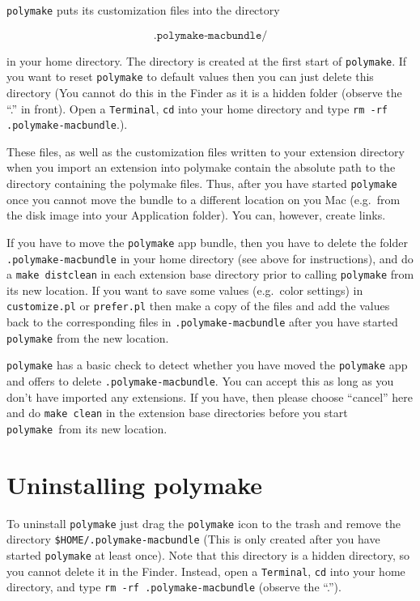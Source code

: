 \documentclass[a4paper]{amsart}
\newcommand{\polymake}{\texttt{polymake}\xspace}
\begin{document}
\polymake puts its customization files into the directory 

\[\texttt{.polymake-macbundle/} \]

in your home directory. The directory is created at the first start of
\polymake. If you want to reset \polymake to default values then you
can just delete this directory (You cannot do this in the Finder as it
is a hidden folder (observe the ``.'' in front). Open a \texttt{Terminal},
\texttt{cd} into your home directory and type \texttt{rm -rf
  .polymake-macbundle}.).

These files, as well as the customization files written to your
extension directory when you import an extension into polymake contain
the absolute path to the directory containing the polymake
files. Thus, after you have started \polymake once you cannot move
the bundle to a different location on you Mac (e.g.\ from the disk
image into your Application folder). You can, however, create links.

If you have to move the \polymake app bundle, then you have to delete
the folder \texttt{.polymake-macbundle} in your home directory (see
above for instructions), and do a \texttt{make distclean} in each
extension base directory prior to calling \polymake from its new
location. If you want to save some values (e.g.\ color settings) in
\texttt{customize.pl} or \texttt{prefer.pl} then make a copy of the
files and add the values back to the corresponding files in
\texttt{.polymake-macbundle} after you have started \polymake from
the new location.

\polymake has a basic check to detect whether you have moved the
\polymake app and offers to delete \texttt{.polymake-macbundle}. You
can accept this as long as you don't have imported any extensions. If
you have, then please choose ``cancel'' here and do \texttt{make
  clean} in the extension base directories before you start \polymake\
from its new location.

\section*{Uninstalling polymake}

To uninstall \polymake just drag the \polymake icon to the trash and
remove the directory \texttt{\${HOME}/.polymake-macbundle} (This is
only created after you have started \polymake at least once). Note
that this directory is a hidden directory, so you cannot delete it
in the Finder. Instead, open a \texttt{Terminal}, \texttt{cd} into
your home directory, and type \texttt{rm -rf .polymake-macbundle}
(observe the ``.'').
\end{document}
